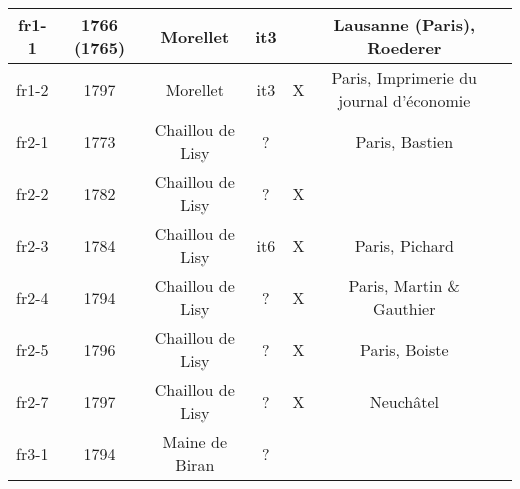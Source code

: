 \begin{longtable}{|c|c|c|c|c|c|c|}
fr1-1 & 1766 (1765) & Morellet & it3 &  & Lausanne (Paris), Roederer \\ \hline
fr1-2 & 1797 & Morellet & it3 & X & Paris, Imprimerie du journal d’économie \\ \hline
fr2-1 & 1773 & Chaillou de Lisy & ? &  & Paris, Bastien \\ \hline
fr2-2 & 1782 & Chaillou de Lisy & ? & X &  \\ \hline
fr2-3 & 1784 & Chaillou de Lisy & it6 & X & Paris, Pichard \\ \hline
fr2-4 & 1794 & Chaillou de Lisy & ? & X & Paris, Martin \& Gauthier \\ \hline
fr2-5 & 1796 & Chaillou de Lisy & ? & X & Paris, Boiste \\ \hline
fr2-7 & 1797 & Chaillou de Lisy & ? & X & Neuchâtel \\ \hline
fr3-1 & 1794 & Maine de Biran & ? &  &  \\ \hline
\end{longtable}